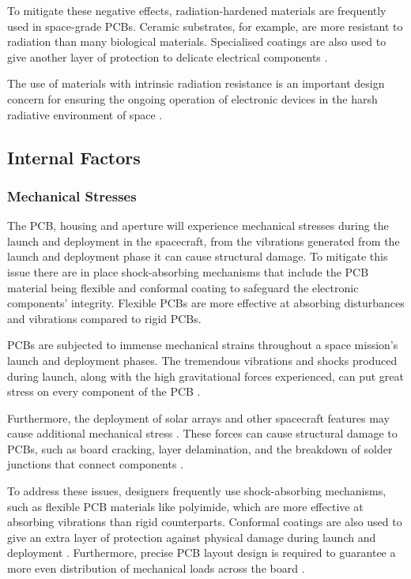 To mitigate these negative effects, radiation-hardened materials are frequently 
used in space-grade PCBs. Ceramic substrates, for example, are more resistant to 
radiation than many biological materials. Specialised coatings are also used to 
give another layer of protection to delicate electrical components \cite{Gatema2024}.

The use of materials with intrinsic radiation resistance is an important design 
concern for ensuring the ongoing operation of electronic devices in the harsh 
radiative environment of space \cite{PCBDirectory2025}.

\subsection{Internal Factors}
\subsubsection{Mechanical Stresses}   
The PCB, housing and aperture will experience mechanical stresses during the launch 
and deployment in the spacecraft, from the vibrations generated from the launch and 
deployment phase it can cause structural damage. To mitigate this issue there are in 
place shock-absorbing mechanisms that include the PCB material being flexible and 
conformal coating to safeguard the electronic components' integrity. Flexible PCBs 
are more effective at absorbing disturbances and vibrations compared to rigid PCBs.

PCBs are subjected to immense mechanical strains throughout a space mission's launch 
and deployment phases. The tremendous vibrations and shocks produced during launch, 
along with the high gravitational forces experienced, can put great stress on every 
component of the PCB \cite{Proto-Electronics2024}.

Furthermore, the deployment of solar arrays and other spacecraft features may cause 
additional mechanical stress \cite{Proto-Electronics2024}. These forces can cause 
structural damage to PCBs, such as board cracking, layer delamination, and the 
breakdown of solder junctions that connect components \cite{Proto-Electronics2024}.

To address these issues, designers frequently use shock-absorbing mechanisms, such 
as flexible PCB materials like polyimide, which are more effective at absorbing 
vibrations than rigid counterparts. Conformal coatings are also used to give an 
extra layer of protection against physical damage during launch and deployment 
\cite{Proto-Electronics2024}. Furthermore, precise PCB layout design is required 
to guarantee a more even distribution of mechanical loads across the board 
\cite{Proto-Electronics2024}.

